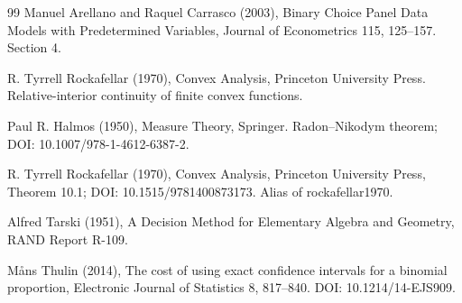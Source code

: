 \documentclass{article}
\begin{document}
\begin{thebibliography}{99}
   Manuel Arellano and Raquel Carrasco (2003), Binary Choice Panel Data Models with Predetermined Variables, Journal of Econometrics 115, 125--157. Section 4.

   R. Tyrrell Rockafellar (1970), Convex Analysis, Princeton University Press. Relative-interior continuity of finite convex functions.

   Paul R. Halmos (1950), Measure Theory, Springer. Radon--Nikodym theorem; DOI: 10.1007/978-1-4612-6387-2.

   R. Tyrrell Rockafellar (1970), Convex Analysis, Princeton University Press, Theorem 10.1; DOI: 10.1515/9781400873173. Alias of rockafellar1970.

   Alfred Tarski (1951), A Decision Method for Elementary Algebra and Geometry, RAND Report R-109.

   Måns Thulin (2014), The cost of using exact confidence intervals for a binomial proportion, Electronic Journal of Statistics 8, 817--840. DOI: 10.1214/14-EJS909.

\end{thebibliography}
\end{document}
